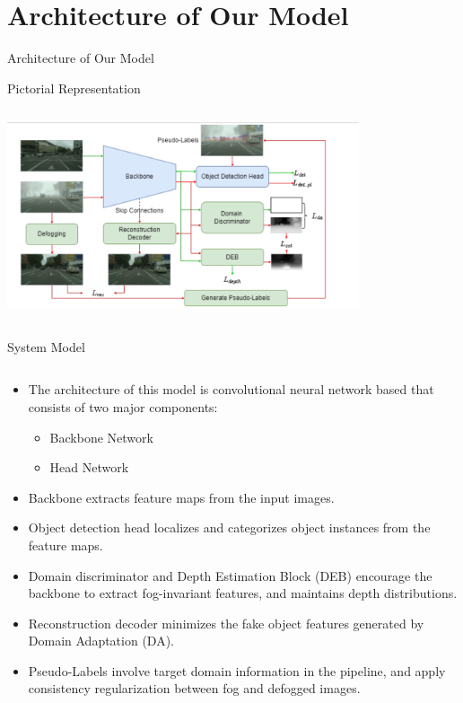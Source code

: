 \documentclass[10pt,aspectratio=169,t]{beamer}
\begin{document}
\section{Architecture of Our Model}
\begin{frame}[allowframebreaks]{Architecture of Our Model}
\vspace{-0.25cm}
\begin{block}
    {Pictorial Representation}
\end{block}
\begin{columns}
\begin{column}{1\textwidth}
\begin{center}
{\includegraphics[height=5.5cm]{architecture.png}}
\end{center}
\end{column}
\end{columns}
\newpage
\vspace{-0.25cm}
\begin{block}
    {System Model}
\end{block}
\vspace{-0.25cm}
\begin{columns}
\begin{column}{1\textwidth}
\begin{itemize}
 \justifying
 \item The architecture of this model is convolutional neural network based that consists of two major components:
 \begin{itemize}
  \item Backbone Network
  \item Head Network
\end{itemize}
\item Backbone extracts feature maps from the input images. 
\item Object detection head localizes and categorizes object instances from the feature maps.
 \item Domain discriminator and Depth Estimation Block (DEB) encourage the backbone to extract fog-invariant features, and maintains depth distributions.
\item Reconstruction decoder minimizes the fake object features generated by Domain Adaptation (DA). 
\item Pseudo-Labels involve target domain information in the pipeline, and apply consistency regularization between fog and defogged images.
\end{itemize}
\end{column}
\end{columns}


\end{frame}
\end{document}
